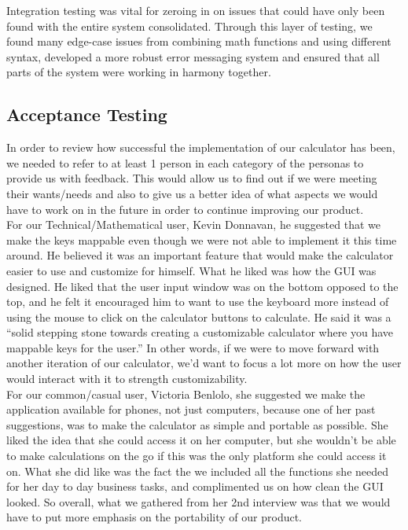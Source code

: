 \documentclass[a4paper, 12pt]{article}
\begin{document}
Integration testing was vital for zeroing in on issues that could have only been found with the entire system consolidated. Through this layer of testing, we found many edge-case issues from combining math functions and using different syntax, developed a more robust error messaging system and ensured that all parts of the system were working in harmony together.


\subsection{Acceptance Testing}

In order to review how successful the implementation of our calculator has been, we needed to refer to at least 1 person in each category of the personas to provide us with feedback. This would allow us to find out if we were meeting their wants/needs and also to give us a better idea of what aspects we would have to work on in the future in order to continue improving our product.
\\

For our Technical/Mathematical user, Kevin Donnavan, he suggested that we make the keys mappable even though we were not able to implement it this time around. He believed it was an important feature that would make the calculator easier to use and customize for himself. What he liked was how the GUI was designed. He liked that the user input window was on the bottom opposed to the top, and he felt it encouraged him to want to use the keyboard more instead of using the mouse to click on the calculator buttons to calculate. He said it was a “solid stepping stone towards creating a customizable calculator where you have mappable keys for the user.” In other words, if we were to move forward with another iteration of our calculator, we’d want to focus a lot more on how the user would interact with it to strength customizability. 
\\

For our common/casual user, Victoria Benlolo, she suggested we make the application available for phones, not just computers, because one of her past suggestions, was to make the calculator as simple and portable as possible. She liked the idea that she could access it on her computer, but she wouldn’t be able to make calculations on the go if this was the only platform she could access it on. What she did like was the fact the we included all the functions she needed for her day to day business tasks, and complimented us on how clean the GUI looked. So overall, what we gathered from her 2nd interview was that we would have to put more emphasis on the portability of our product. 
\\
\end{document}
